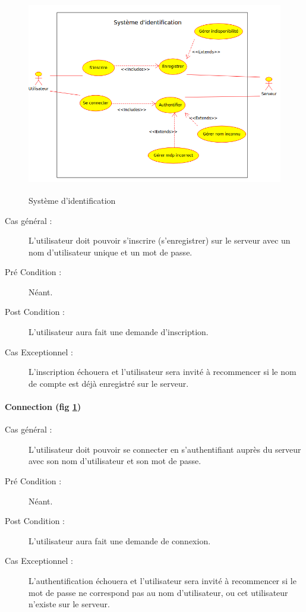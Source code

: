 \documentclass[a4paper]{article}
\begin{document}
\begin{figure}[H]
   \begin{center}
   \includegraphics[height=250pt]{uml/id.png}
   \caption{\label{diag-use-inscription} Système d'identification}
   \end{center}
\end{figure}

\begin{description}
\item[Cas général  :] L'\gls{utilisateur} doit pouvoir s'inscrire (s'enregistrer) sur le \gls{serveur} avec un nom d'\gls{utilisateur} unique et un mot de passe.
\item[Pré Condition  :] Néant.
\item[Post Condition :] L'\gls{utilisateur} aura fait une demande d'inscription.
\item[Cas Exceptionnel :] L'inscription échouera et l'\gls{utilisateur} sera invité à recommencer si le nom de compte est déjà enregistré sur le \gls{serveur}.
\end{description}

\paragraph{Connection (fig \ref{diag-use-inscription})}
\begin{description}
\item[Cas général :] L'\gls{utilisateur} doit pouvoir se connecter en s'authentifiant auprès du \gls{serveur} avec son nom d'\gls{utilisateur} et son mot de passe.
\item[Pré Condition  :] Néant.
\item[Post Condition :] L'\gls{utilisateur} aura fait une demande de connexion.
\item[Cas Exceptionnel :] L'authentification échouera et l'\gls{utilisateur} sera invité à recommencer si le mot de passe ne correspond pas au nom d'\gls{utilisateur}, ou cet \gls{utilisateur} n'existe sur le \gls{serveur}.
\end{description}
\end{document}
